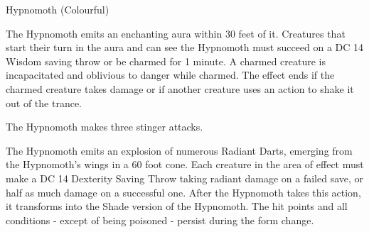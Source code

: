 \vfill\eject\vspace*{-5.6em}
\begin{DndMonster}[width=0.5\textwidth]{Hypnomoth (Colourful)\label{monster:HypnomothColourful}}
	
	\DndMonsterBasics[
		armor-class = {15 (natural armor)},
		hit-points  = {\DndDice{15d10 + 30}},
		speed       = {20 ft., fly 60 ft.},
		initiative	= {+3},
	]
	
	\DndMonsterAbilityScores[
		str = 12,
		dex = 16,
		con = 14,
		int = 6,
		wis = 14,
		cha = 10,
	]
	
	\DndMonsterDetails[
		skills = {Perception +4},
		senses = {Darkvision 60 ft., passive Perception 14},
		languages = {Understands Sylvan but can't speak},
		challenge =5,
	]
	
	The Hypnomoth emits an enchanting aura within 30 feet of it. Creatures that start their turn in the aura and can see the Hypnomoth must succeed on a DC 14 Wisdom saving throw or be charmed for 1 minute. A charmed creature is incapacitated and oblivious to danger while charmed. The effect ends if the charmed creature takes damage or if another creature uses an action to shake it out of the trance.
	
	The Hypnomoth makes three stinger attacks.   
	
	\DndMonsterAttack[
		name=Stinger,
		distance=melee, %
		mod=+5,
		reach=5,
		targets=one target,
		dmg={\DndDice{1d8 + 3}},
		dmg-type=piercing,
		plus-dmg={\DndDice{2d6}},
		plus-dmg-type=poison,
	]
	
	\DndMonsterAttack[
		name=Radiant Dart,
		distance=melee, %
		mod=+5,
		reach=120,
		targets=one target,
		dmg={\DndDice{1d12 + 3}},
		dmg-type=radiant,
	]
	
	The Hypnomoth emits an explosion of numerous Radiant Darts, emerging from the Hypnomoth's wings in a 60 foot cone. Each creature in the area of effect must make a DC 14 Dexterity Saving Throw taking  radiant damage on a failed save, or half as much damage on a successful one.  After the Hypnomoth takes this action, it transforms into the Shade version of the Hypnomoth. The hit points and all conditions - except of being poisoned - persist during the form change.
\end{DndMonster}

